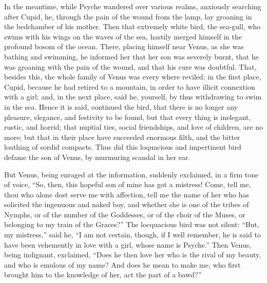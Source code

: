 \documentclass{article}
\begin{document}
In the meantime, while Psyche wandered over various realms, anxiously searching
after Cupid, he, through the pain of the wound from the lamp, lay groaning in
the bedchamber of his mother. Then that extremely white bird, the sea-gull, who
swims with his wings on the waves of the sea, hastily merged himself in the
profound bosom of the ocean. There, placing himself near Venus, as she was
bathing and swimming, he informed her that her son was severely burnt, that he
was groaning with the pain of the wound, and that his cure was doubtful. That,
besides this, the whole family of Venus was every where reviled; in the first
place, Cupid, because he had retired to a mountain, in order to have illicit
connextion with a girl; and, in the next place, said he, yourself, by thus
withdrawing to swim in the sea. Hence it is said, continued the bird, that
there is no longer any pleasure, elegance, and festivity to be found, but that
every thing is inelegant, rustic, and horrid; that nuptial ties, social
friendships, and love of children, are no more; but that in their place have
succeeded enormous filth, and the bitter loathing of sordid compacts. Thus did
this loquacious and impertinent bird defame the son of Venus, by murmuring
scandal in her ear.

But Venus, being enraged at the information, suddenly exclaimed, in a firm tone
of voice, ``So, then, this hopeful son of mine has got a mistress! Come, tell
me, thou who alone dost serve me with affection, tell me the name of her who
has solicited the ingenuous and naked boy, and whether she is one of the tribes
of Nymphs, or of the number of the Goddesses, or of the choir of the Muses, or
belonging to my train of the Graces?'' The locquacious bird was not silent:
``But, my mistress,'' said he, ``I am not certain, though, if I well remember,
he is said to have been vehemently in love with a girl, whose name is Psyche.''
Then Venus, being indignant, exclaimed, ``Does he then love her who is the
rival of my beauty, and who is emulous of my name? And does he mean to make me,
who first brought him to the knowledge of her, act the part of a bawd?''
\end{document}

